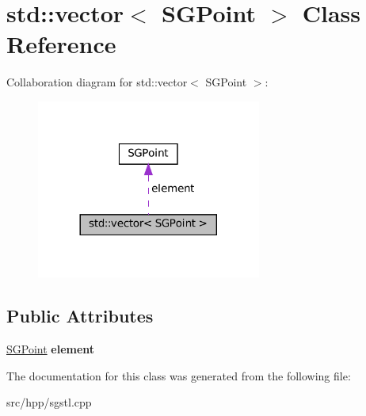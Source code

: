 \hypertarget{classstd_1_1vector_3_01SGPoint_01_4}{}\section{std\+:\+:vector$<$ S\+G\+Point $>$ Class Reference}
\label{classstd_1_1vector_3_01SGPoint_01_4}


Collaboration diagram for std\+:\+:vector$<$ S\+G\+Point $>$\+:
\nopagebreak
\begin{figure}[H]
\begin{center}
\leavevmode
\includegraphics[width=209pt]{classstd_1_1vector_3_01SGPoint_01_4__coll__graph}
\end{center}
\end{figure}
\subsection*{Public Attributes}
\begin{DoxyCompactItemize}
\item 
\mbox{\label{classstd_1_1vector_3_01SGPoint_01_4_a3ba6736f39c1e7afaa9af59c8762dbd7}} 
\hyperlink{classSGPoint}{S\+G\+Point} {\bfseries element}
\end{DoxyCompactItemize}


The documentation for this class was generated from the following file\+:\begin{DoxyCompactItemize}
\item 
src/hpp/sgstl.\+cpp\end{DoxyCompactItemize}

